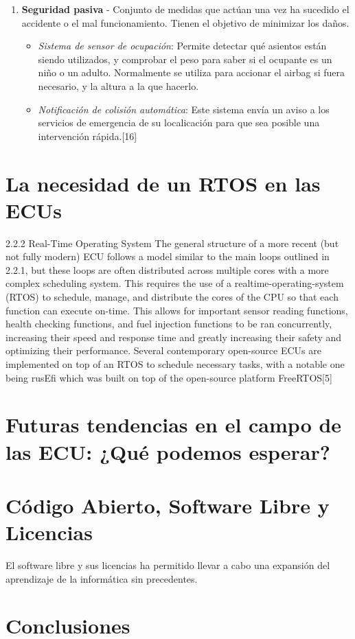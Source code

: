 \begin{enumerate}
    \item \textbf{Seguridad pasiva} - Conjunto de medidas que actúan una vez ha sucedido el accidente o el mal funcionamiento. Tienen el objetivo de minimizar los daños.

    \begin{itemize}
        \item \textit{Sistema de sensor de ocupación}: Permite detectar qué asientos están siendo utilizados, y comprobar el peso para saber si el ocupante es un niño o un adulto. Normalmente se utiliza para accionar el airbag si fuera necesario, y la altura a la que hacerlo.

        \item \textit{Notificación de colisión automática}: Este sistema envía un aviso a los servicios de emergencia de su localicación para que sea posible una intervención rápida.[16]
    \end{itemize}
\end{enumerate}




\section{La necesidad de un RTOS en las ECUs}

2.2.2 Real-Time Operating System
The general structure of a more recent (but not fully modern) ECU follows a model
similar to the main loops outlined in 2.2.1, but these loops are often distributed across
multiple cores with a more complex scheduling system. This requires the use of a realtime-operating-system (RTOS) to schedule, manage, and distribute the cores of the CPU so
that each function can execute on-time. This allows for important sensor reading functions,
health checking functions, and fuel injection functions to be ran concurrently, increasing
their speed and response time and greatly increasing their safety and optimizing their performance. Several contemporary open-source ECUs are implemented on top of an RTOS
to schedule necessary tasks, with a notable one being rusEfi which was built on top of the
open-source platform FreeRTOS[5]

\section{Futuras tendencias en el campo de las ECU: ¿Qué podemos esperar?}

\section{Código Abierto, Software Libre y Licencias}

El software libre y sus licencias \cite{gplv3} ha permitido llevar a cabo una expansión del
aprendizaje de la informática sin precedentes.

\section{Conclusiones}